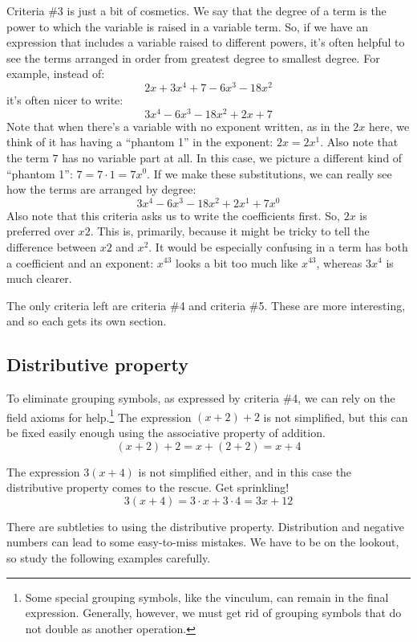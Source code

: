 Criteria \#3 is just a bit of cosmetics. We say that the \gls{degree of a term} is the power to which the variable is raised in a variable term. So, if we have an expression that includes a variable raised to different powers, it's often helpful to see the terms arranged in order from greatest degree to smallest degree. For example, instead of:
\[2x + 3x^4 + 7 - 6x^3 - 18x^2\]
it's often nicer to write:
\[3x^4 - 6x^3 - 18x^2 + 2x + 7\]
Note that when there's a variable with no exponent written, as in the $2x$ here, we think of it has having a ``phantom 1'' in the exponent: $2x = 2x^1$. Also note that the term $7$ has no variable part at all. In this case, we picture a different kind of ``phantom 1'': $7 = 7 \cdot 1 = 7x^0$. If we make these substitutions, we can really see how the terms are arranged by degree:
\[3x^4 - 6x^3 - 18x^2 + 2x^1 + 7x^0\]
Also note that this criteria asks us to write the coefficients first. So, $2x$ is preferred over $x2$. This is, primarily, because it might be tricky to tell the difference between $x2$ and $x^2$. It would be especially confusing in a term has both a coefficient and an exponent: $x^43$ looks a bit too much like $x^{43}$, whereas $3x^4$ is much clearer.

The only criteria left are criteria \#4 and criteria \#5. These are more interesting, and so each gets its own section.

\subsection{Distributive property}

To eliminate grouping symbols, as expressed by criteria \#4, we can rely on the field axioms for help.\footnote{Some special grouping symbols, like the vinculum, can remain in the final expression. Generally, however, we must get rid of grouping symbols that do not double as another operation.} The expression $(x + 2) + 2$ is not simplified, but this can be fixed easily enough using the associative property of addition.
\[(x+2)+2 = x+(2+2) = x+4\]

The expression $3(x + 4)$ is not simplified either, and in this case the distributive property comes to the rescue. Get sprinkling!
\[3(x+4) = 3 \cdot x + 3\cdot 4 = 3x + 12\]

There are subtleties to using the distributive property. Distribution and negative numbers can lead to some easy-to-miss mistakes. We have to be on the lookout, so study the following examples carefully.

